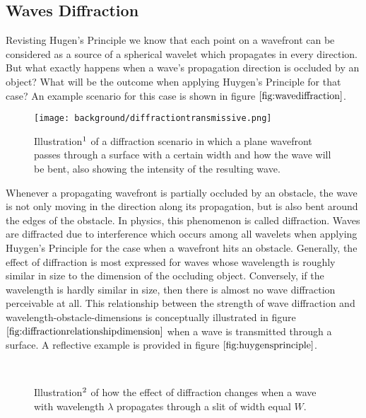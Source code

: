 \subsection{Waves Diffraction}
Revisting Hugen's Principle we know that each point on a wavefront can be considered as a source of a spherical wavelet which propagates in every direction. But what exactly happens when a wave's propagation direction is occluded by an object? What will be the outcome when applying Huygen's Principle for that case? An example scenario for this case is shown in figure $\ref{fig:wavediffraction}$. 

\begin{figure}[H]
  \centering
  \texttt{[image: background/diffractiontransmissive.png]}
  \caption[Diffracted Wave]{Illustration$\footnotemark$ of a diffraction scenario in which a plane wavefront passes through a surface with a certain width and how the wave will be bent, also showing the intensity of the resulting wave.}
  \label{fig:wavediffraction}
\end{figure}

Whenever a propagating wavefront is partially occluded by an obstacle, the wave is not only moving in the direction along its propagation, but is also bent around the edges of the obstacle. In physics, this phenomenon is called diffraction. Waves are diffracted due to interference which occurs among all wavelets when applying Huygen's Principle for the case when a wavefront hits an obstacle. Generally, the effect of diffraction is most expressed for waves whose wavelength is roughly similar in size to the dimension of the occluding object. Conversely, if the wavelength is hardly similar in size, then there is almost no wave diffraction perceivable at all. This relationship between the strength of wave diffraction and wavelength-obstacle-dimensions is conceptually illustrated in figure $\ref{fig:diffractionrelationshipdimension}$ when a wave is transmitted through a surface. A reflective example is provided in figure $\ref{fig:huygensprinciple}$.

\begin{figure}[H]
  \centering
~
~
  \caption[Diffraction for different $\texttt{Wavelength/Slit-Width}$ ratio]{Illustration$\footnotemark$ of how the effect of diffraction changes when a wave with wavelength $\lambda$ propagates through a slit of width equal $W$.}
  \label{fig:diffractionrelationshipdimension}
\end{figure}

